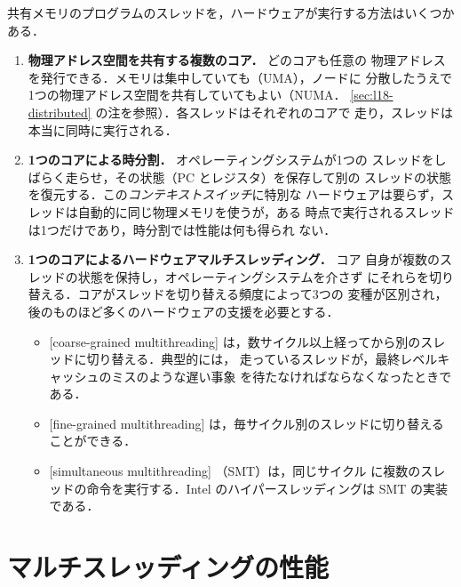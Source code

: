 \documentclass[../main.tex]{subfiles}
\begin{document}
共有メモリのプログラムのスレッドを，ハードウェアが実行する方法はいくつか
ある．
\begin{enumerate}
  \item \textbf{物理アドレス空間を共有する複数のコア．} どのコアも任意の
    物理アドレスを発行できる．メモリは集中していても（UMA），ノードに
    分散したうえで1つの物理アドレス空間を共有していてもよい（NUMA．
    \cref{sec:l18-distributed} の注を参照）．各スレッドはそれぞれのコアで
    走り，スレッドは本当に同時に実行される．
  \item \textbf{1つのコアによる時分割．} オペレーティングシステムが1つの
    スレッドをしばらく走らせ，その状態（PC とレジスタ）を保存して別の
    スレッドの状態を復元する．この\emph{コンテキストスイッチ}に特別な
    ハードウェアは要らず，スレッドは自動的に同じ物理メモリを使うが，ある
    時点で実行されるスレッドは1つだけであり，時分割では性能は何も得られ
    ない．
  \item \textbf{1つのコアによるハードウェアマルチスレッディング．} コア
    自身が複数のスレッドの状態を保持し，オペレーティングシステムを介さず
    にそれらを切り替える．コアがスレッドを切り替える頻度によって3つの
    変種が区別され，後のものほど多くのハードウェアの支援を必要とする．
    \begin{itemize}
      \item {}[coarse-grained multithreading]%
        は，数サイクル以上経ってから別のスレッドに切り替える．典型的には，
        走っているスレッドが，最終レベルキャッシュのミスのような遅い事象
        を待たなければならなくなったときである．
      \item {}[fine-grained multithreading]%
        は，毎サイクル別のスレッドに切り替えることができる．
      \item {}[simultaneous multithreading]%
        （SMT）は，同じサイクル
        に複数のスレッドの命令を実行する．Intel のハイパースレッディングは
        SMT の実装である．
    \end{itemize}
\end{enumerate}

\section{マルチスレッディングの性能}
\label{sec:l18-mt-performance}
\end{document}
